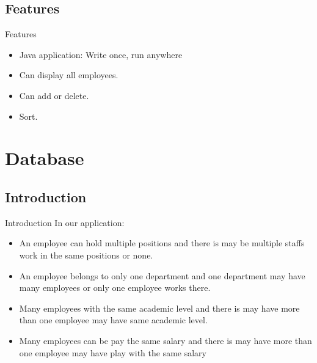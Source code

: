\documentclass{beamer}
\begin{document}
\subsection{Features}

\begin{frame}{Features}
  \begin{itemize}
  \item {
    Java application: Write once, run anywhere
        \pause %
  }
  \item { 
    Can display all employees.  
      }
  \item<3-> {
     Can add or delete.
  }
  \item<4-> {
   Sort. 
  }
  
  \end{itemize}
\end{frame}

\section{Database}

\subsection{Introduction}
\begin{frame}{Introduction}
In our application:
  \begin{itemize}
  \item {
An employee can hold multiple positions and there is may be multiple staffs work in the same positions or none.
  }
  \item {
 An employee belongs to only one department and one department may have many employees or only one employee works there.
  }
  \item{
Many employees with the same academic level and there is may have more than one employee may have same academic level.

  }
 \item{
  Many employees can be pay the same salary and there is may have more than one employee may have play with the same salary 
}
  \end{itemize}

\end{frame}
\end{document}
